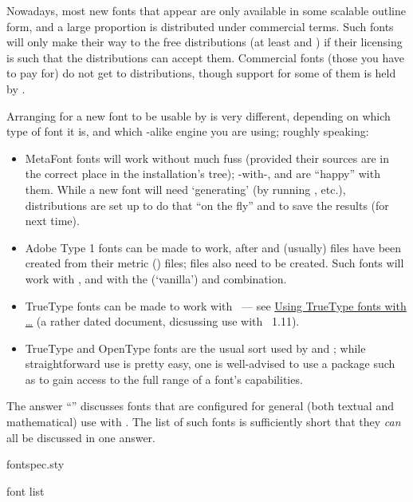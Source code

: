 Nowadays, most new fonts that appear are only available in some
scalable outline form, and a large proportion is distributed under
commercial terms.  Such fonts will only make their way to the free
distributions (at least \texlive{} and \miktex{}) if their licensing
is such that the distributions can accept them.  Commercial fonts
(those you have to pay for) do not get to distributions, though
support for some of them is held by .

Arranging for a new font to be usable by \alltex{} is very different,
depending on which type of font it is, and which \tex{}-alike engine
you are using; roughly speaking:
\begin{itemize}
\item MetaFont fonts will work without much fuss (provided their
  sources are in the correct place in the installation's tree);
  \tex{}-with-, and \pdftex{} are ``happy'' with them.
  While a new font will need `generating' (by running \mf{}, etc.),
  distributions are set up to do that ``on the fly'' and to save the
  results (for next time).
\item Adobe Type 1 fonts can be made to work, after 
  and (usually)  files have been created from their
  metric () files;  files also need to
  be created.  Such fonts will work with \pdftex{}, and with the
  (`vanilla')\alltex{} and  combination.
\item TrueType fonts can be made to work with \pdftex{}~--- see
\href{http://www.radamir.com/tex/ttf-tex.htm}{Using TrueType fonts with \tex{}\dots{}}
  (a rather dated document, dicsussing use with \miktex{}~1.11).
\item TrueType and OpenType fonts are the usual sort used by \xetex{}
  and \luatex{}; while straightforward use is pretty easy, one is
  well-advised to use a package such as  to gain
  access to the full range of a font's capabilities.
\end{itemize}

The answer ``'' discusses
fonts that are configured for general (both textual and mathematical)
use with \AllTeX{}.  The list of such fonts is sufficiently short that
they \emph{can} all be discussed in one answer.
\begin{ctanrefs}
\item[fontspec.sty]
\item[\nothtml{\rmfamily}\MF{} font list]
\end{ctanrefs}

